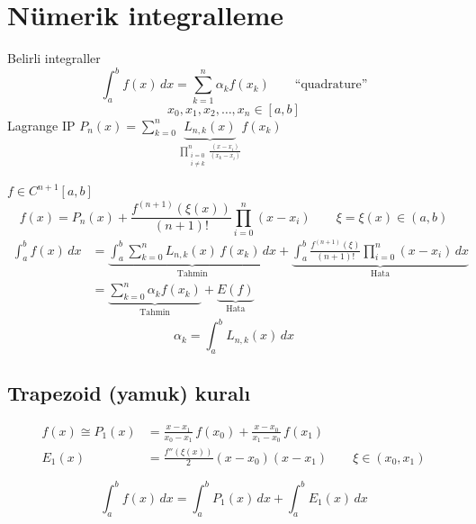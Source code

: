 \documentclass[11pt,a4paper]{article}
\begin{document}

\section{Nümerik integralleme}
\noindent Belirli integraller
\[
  \int_a^b f(x)\,dx = \sum_{k=1}^{n} \alpha_k f(x_k) \qquad \text{``quadrature''}
\]
\[
  x_0, x_1, x_2, \ldots, x_n \in [a,b]
\]
Lagrange IP \qquad
$\displaystyle P_n(x) = \sum_{k=0}^{n} \underbrace{L_{n,k}(x)}_{\prod\limits_{\substack{i=0\\ i\ne k}}^{n}\frac{(x-x_i)}{(x_k-x_i)}} f(x_k)$

\medskip
$f \in C^{n+1}[a,b]$
\[
  f(x) = P_n(x) + \frac{f^{(n+1)}(\xi(x))}{(n+1)!}\prod_{i=0}^{n}(x-x_i) \qquad \xi = \xi(x) \in (a,b)
\]
\begin{align*}
  \int_a^b f(x)\,dx &= \underbrace{\int_a^b \sum_{k=0}^{n} L_{n,k}(x)\,f(x_k)\,dx}_{\text{Tahmin}}
    + \underbrace{\int_a^b \frac{f^{(n+1)}(\xi)}{(n+1)!}\prod_{i=0}^{n}(x-x_i)\,dx}_{\text{Hata}}\\
  &= \underbrace{\sum_{k=0}^{n} \alpha_k f(x_k)}_{\text{Tahmin}} + \underbrace{E(f)}_{\text{Hata}}
\end{align*}
\[
  \alpha_k = \int_a^b L_{n,k}(x)\,dx
\]

\subsection{Trapezoid (yamuk) kuralı}
\noindent
\begin{minipage}[c]{0.58\linewidth}
\begin{align*}
  f(x) \cong P_1(x) &= \frac{x-x_1}{x_0-x_1}\,f(x_0) + \frac{x-x_0}{x_1-x_0}\,f(x_1)\\
  E_1(x) &= \frac{f''(\xi(x))}{2}(x-x_0)(x-x_1) \qquad \xi \in (x_0,x_1)
\end{align*}
\end{minipage}\hfill
\begin{minipage}[c]{0.4\linewidth}
\centering
{}
\[
  \int_a^b f(x)\,dx = \int_a^b P_1(x)\,dx + \int_a^b E_1(x)\,dx
\]
\end{minipage}
\end{document}

